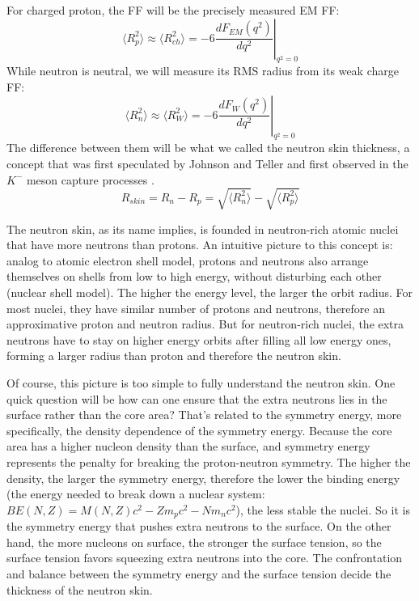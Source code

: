 For charged proton, the FF will be the precisely measured EM FF:
\begin{equation}
    \langle R_p^2 \rangle \approx \langle R_{ch}^2 \rangle= -6 \left. \frac{dF_{EM}(q^2)}{dq^2} \right|_{q^2 = 0}
\end{equation}
While neutron is neutral, we will measure its RMS radius from its weak charge
FF:
\begin{equation}
    \langle R_n^2 \rangle \approx \langle R_W^2 \rangle = -6 \left. \frac{dF_{W}(q^2)}{dq^2} \right|_{q^2 = 0}
\end{equation}
The difference between them will be what we called the neutron skin thickness,
a concept that was first speculated by Johnson and Teller \cite{PhysRev.93.357}
and first observed in the $K^-$ meson capture processes \cite{BURHOP1969625}.
\begin{equation}
    R_{skin} = R_n - R_p = \sqrt{\langle R_n^2 \rangle} - \sqrt{\langle R_p^2 \rangle}
\end{equation}

The neutron skin, as its name implies, is founded in neutron-rich atomic nuclei that
have more neutrons than protons. An intuitive picture to this concept is: analog to
atomic electron shell model, protons and neutrons also arrange themselves on
shells from low to high energy, without disturbing each other (nuclear shell model).
The higher the energy level, the larger the orbit radius.
For most nuclei, they have similar number of protons and neutrons, therefore an 
approximative proton and neutron radius. But for neutron-rich nuclei, the extra neutrons
have to stay on higher energy orbits after filling all low energy ones, forming
a larger radius than proton and therefore the neutron skin.

Of course, this picture is too simple to fully understand the neutron skin.
One quick question will be how can one ensure that the extra neutrons lies 
in the surface rather than the core area? That's related to the symmetry energy, 
more specifically, the density dependence of the symmetry energy. 
Because the core area has a higher nucleon density than the surface, and symmetry energy 
represents the penalty for breaking the proton-neutron symmetry. The higher the density, 
the larger the symmetry energy, therefore the lower the binding energy (the energy
needed to break down a nuclear system: $BE(N, Z) = M(N, Z)c^2 - Zm_p c^2 - Nm_n c^2$), the less
stable the nuclei. So it is the symmetry energy that pushes extra neutrons to 
the surface. On the other hand, the more nucleons on surface, the stronger 
the surface tension, so the surface tension favors squeezing extra neutrons 
into the core. The confrontation and balance between the symmetry energy and 
the surface tension decide the thickness of the neutron skin.

